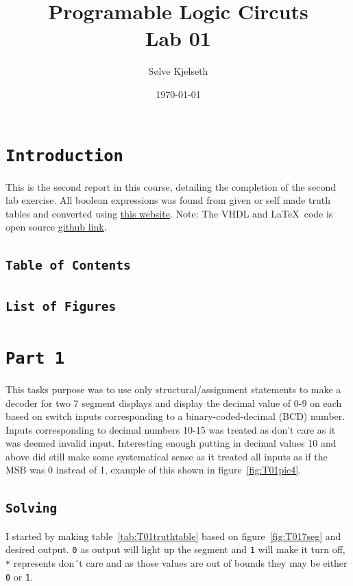 \documentclass{article}
\title{\fontsize{24}{36}\selectfont Programable Logic Circuts\\ %
Lab 01} %
\author{Sølve Kjelseth} %
\date{\today} %
\makeatletter
\let\oldsection\section
\renewcommand{\section}[1]{%
  \oldsection{\texttt{#1}} %
  \setcounter{subsection}{-1} %
  \setcounter{figure}{-1} %
  \setcounter{table}{-1} %
}
\let\oldsubsection\subsection
\renewcommand{\subsection}[1]{%
  \oldsubsection{\texttt{#1}}%
  \setcounter{subsubsection}{-1}%
}
\renewcommand{\tableofcontents}{%
    \subsection{Table of Contents} %
    \@starttoc{toc}%
}
\renewcommand{\listoffigures}{%
    \subsection{List of Figures} %
    \@starttoc{lof}%
}
\makeatother
\begin{document}
\maketitle %




\section{Introduction} %
This is the second report in this course, detailing the completion of the second lab exercise. All boolean expressions was found from given or self made truth tables and converted using
\href{https://tma.main.jp/logic/index_en.html}{this website}.
Note: The VHDL and \LaTeX\ code is open source
\href{https://github.com/Kjelseth/PLK_lab.git}{github link}.
\tableofcontents %
\clearpage
\listoffigures %

\section{Part 1}
This tasks purpose was to use only structural/assignment statements to make a decoder for two 7 segment displays and display the decimal value of 0-9 on each based on switch inputs corresponding to a binary-coded-decimal (BCD) number. Inputs corresponding to decimal numbers 10-15 was treated as don't care as it was deemed invalid input. Interesting enough putting in decimal values 10 and above did still make some systematical sense as it treated all inputs as if the MSB was 0 instead of 1, example of this shown in figure~\ref{fig:T01pic4}.


\subsection{Solving}
I started by making table~\ref{tab:T01truthtable} based on figure~\ref{fig:T017seg} and desired output. \verb|0| as output will light up the segment and \verb|1| will make it turn off, \verb|*| represents don´t care and as those values are out of bounds they may be either \verb|0| or \verb|1|.
\end{document}
